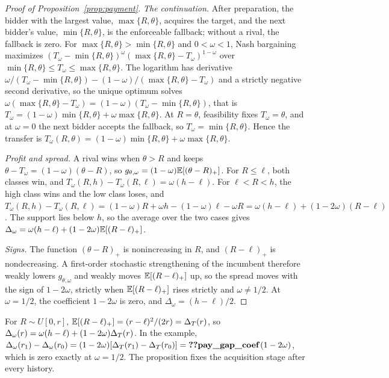 \begin{proof}[Proof of Proposition~\ref{prop:payment}]
\emph{The continuation.} After preparation, the bidder with the largest value, \(\max\{R,\theta\}\), acquires the target,
and the next bidder's value, \(\min\{R,\theta\}\), is the enforceable fallback; without a rival, the fallback is
zero. For \(\max\{R,\theta\}>\min\{R,\theta\}\) and \(0<\omega<1\), Nash bargaining maximizes
\((T_\omega-\min\{R,\theta\})^\omega(\max\{R,\theta\}-T_\omega)^{1-\omega}\) over
\(\min\{R,\theta\}\le T_\omega\le\max\{R,\theta\}\). The logarithm has derivative
\(\omega/(T_\omega-\min\{R,\theta\})-(1-\omega)/(\max\{R,\theta\}-T_\omega)\) and a strictly negative second
derivative, so the unique optimum solves \(\omega(\max\{R,\theta\}-T_\omega)=(1-\omega)(T_\omega-\min\{R,\theta\})\),
that is \(T_\omega=(1-\omega)\min\{R,\theta\}+\omega\max\{R,\theta\}\). At \(R=\theta\), feasibility fixes
\(T_\omega=\theta\), and at \(\omega=0\) the next bidder accepts the fallback, so \(T_\omega=\min\{R,\theta\}\). Hence the
transfer is \(T_\omega(R,\theta)=(1-\omega)\min\{R,\theta\}+\omega\max\{R,\theta\}\).

\emph{Profit and spread.} A rival wins when \(\theta>R\) and keeps \(\theta-T_\omega=(1-\omega)(\theta-R)\), so
\(g_{\theta,\omega}=(1-\omega)\mathbb{E}[(\theta-R)_+]\). For \(R\le\ell\), both classes win, and
\(T_\omega(R,h)-T_\omega(R,\ell)=\omega(h-\ell)\). For \(\ell<R<h\), the high class wins and the low class loses, and
\(T_\omega(R,h)-T_\omega(R,\ell)=(1-\omega)R+\omega h-(1-\omega)\ell-\omega R=\omega(h-\ell)+(1-2\omega)(R-\ell)\). The
support lies below \(h\), so the average over the two cases gives
\(\Delta_\omega=\omega(h-\ell)+(1-2\omega)\mathbb{E}[(R-\ell)_+]\).

\emph{Signs.} The function \((\theta-R)_+\) is nonincreasing in \(R\), and \((R-\ell)_+\) is nondecreasing. A
first-order stochastic strengthening of the incumbent therefore weakly lowers \(g_{\theta,\omega}\) and weakly moves
\(\mathbb{E}[(R-\ell)_+]\) up, so the spread moves with the sign of \(1-2\omega\), strictly when \(\mathbb{E}[(R-\ell)_+]\) rises
strictly and \(\omega\ne1/2\). At \(\omega=1/2\), the coefficient \(1-2\omega\) is zero, and \(\Delta_\omega=(h-\ell)/2\).
\end{proof}

For \(R\sim U[0,r]\), \(\mathbb{E}[(R-\ell)_+]=(r-\ell)^2/(2r)=\Delta_T(r)\), so \(\Delta_\omega(r)=\omega(h-\ell)+(1-2\omega)\Delta_T(r)\).
In the example, \(\Delta_\omega(r_1)-\Delta_\omega(r_0)=(1-2\omega)[\DT(r_1)-\DT(r_0)]=\reg{pay_gap_coef}\,(1-2\omega)\),
which is zero exactly at \(\omega=1/2\). The proposition fixes the acquisition stage after every history.

